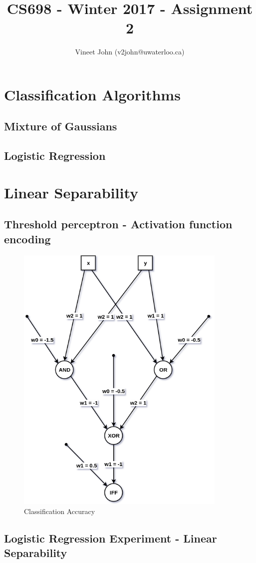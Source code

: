 \documentclass[a4paper]{article}
\title{CS698 - Winter 2017 - Assignment 2}
\author{Vineet John (v2john@uwaterloo.ca)}
\date{}
\begin{document}
\maketitle

\renewcommand\thesubsection{\alph{subsection}}

\section{Classification Algorithms}

\subsection{Mixture of Gaussians}

\subsection{Logistic Regression}

\newpage

\section{Linear Separability}

\subsection{Threshold perceptron - Activation function encoding}
\begin{figure}[h]
    \centering
    \includegraphics[width=0.9\textwidth]{images/activation_functions.png}
    \caption{Classification Accuracy}
    \label{fig_classification_accuracy}
\end{figure}

\newpage

\subsection{Logistic Regression Experiment - Linear Separability}
\end{document}
